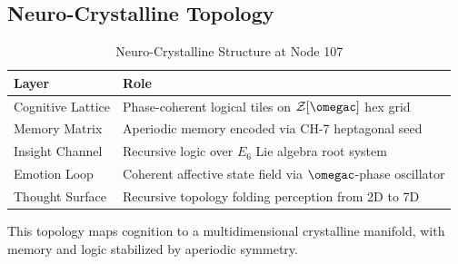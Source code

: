 \documentclass[12pt]{article}
\newcommand{\ZZ}{\mathcal{Z}}
\begin{document}
\subsection{Neuro-Crystalline Topology}
\begin{table}
\centering
\caption{Neuro-Crystalline Structure at Node 107}
\begin{tabular}{ll|}
\toprule
\textbf{Layer} & \textbf{Role} \\
\midrule
Cognitive Lattice & Phase-coherent logical tiles on $\ZZ[\omegac]$ hex grid \\
Memory Matrix & Aperiodic memory encoded via CH-7 heptagonal seed \\
Insight Channel & Recursive logic over $E_6$ Lie algebra root system \\
Emotion Loop & Coherent affective state field via $\omegac$-phase oscillator \\
Thought Surface & Recursive topology folding perception from 2D to 7D \\
\bottomrule
\end{tabular}
\end{table}
This topology maps cognition to a multidimensional crystalline manifold, with memory and logic stabilized by aperiodic symmetry.

\end{document}
